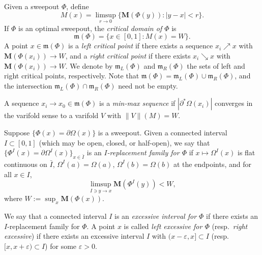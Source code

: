 \begin{definition}\label{def:critical-set}
Given a sweepout $\Phi$, define
\[
M(x) = \limsup_{r \to 0} \{\mathbf{M}(\Phi(y)): |y-x| < r\}.
\]
If $\Phi$ is an optimal sweepout, the \emph{critical domain of $\Phi$} is
\[
\mathfrak{m}(\Phi)=\{ x \in [0,1]: M(x) =W \}.
\]
A point $x \in \mathfrak{m}(\Phi)$ is a \emph{left critical point} if there exists a sequence $x_i \nearrow x$ with $\mathbf{M}(\Phi(x_i)) \to W$, and a \emph{right critical point} if there exists $x_i \searrow x$ with $\mathbf{M}(\Phi(x_i)) \to W$. We denote by $\mathfrak{m}_L(\Phi)$ and $\mathfrak{m}_R(\Phi)$ the sets of left and right critical points, respectively. Note that $\mathfrak{m}(\Phi) = \mathfrak{m}_L(\Phi) \cup \mathfrak{m}_R(\Phi)$, and the intersection $\mathfrak{m}_L(\Phi) \cap \mathfrak{m}_R(\Phi)$ need not be empty.

A sequence $x_i \to x_0 \in \mathfrak{m}(\Phi)$ is a \emph{min-max sequence} if $|\partial^*\Omega(x_i)|$ converges in the varifold sense to a varifold $V$ with $\|V\|(M) = W$.
\end{definition}

\begin{definition}\label{def:excessive-interval}
Suppose $\{\Phi(x) = \partial\Omega(x)\}$ is a sweepout. Given a connected interval $I \subset [0,1]$
(which may be open, closed, or half-open), we say that $\{\Phi^I(x) = \partial\Omega^I(x)\}_{x\in \bar{I}}$
is an \emph{$I$-replacement family for $\Phi$} if
$x \mapsto \Omega^I(x)$ is flat continuous on $\bar{I}$,
$\Omega^I(a) = \Omega(a)$, $\Omega^I(b) = \Omega(b)$ at the endpoints, and for all $x \in I$,
\[
\limsup_{I \ni y \to x} \mathbf{M}(\Phi^I(y)) < W,
\]
where $W := \sup_x \mathbf{M}(\Phi(x))$.

We say that a connected interval $I$ is an \emph{excessive interval for $\Phi$} if there exists an $I$-replacement family
for $\Phi$. A point $x$ is called \emph{left excessive for $\Phi$} (resp.\ \emph{right excessive}) if there exists an excessive interval $I$ with
$(x-\varepsilon, x] \subset I$ (resp.\ $[x, x+\varepsilon) \subset I$) for some $\varepsilon > 0$.
\end{definition}

